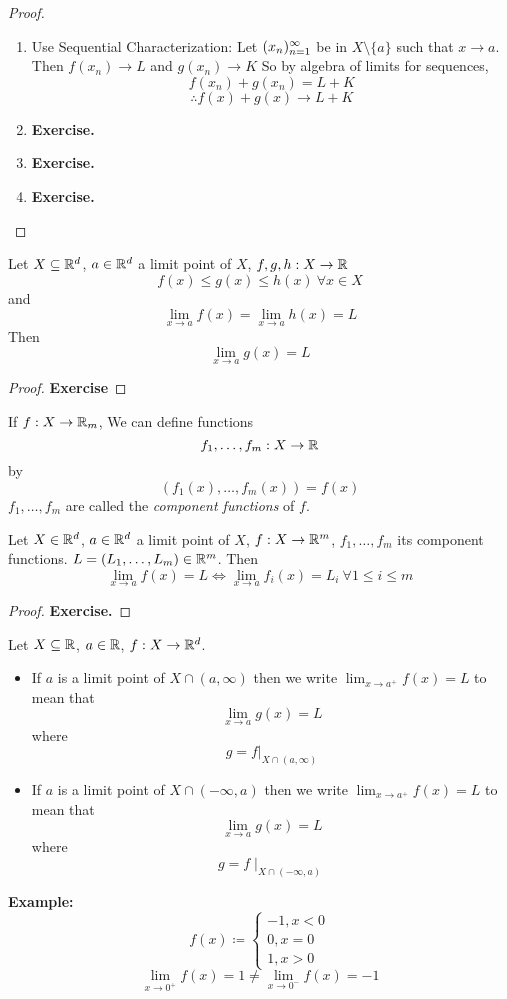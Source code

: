 \documentclass[openany]{report}
\begin{document}
\begin{proof}
    \begin{enumerate}[label=(\roman*)]
        \item Use Sequential Characterization: Let $({x}_n)_{n=1}^\infty$ be in $X \setminus \{a\}$
        such that $x \rightarrow a$. Then $f(x_n) \rightarrow L$ and $g(x_n) \rightarrow K$
        So by algebra of limits for sequences, 
        $$f(x_n) + g(x_n) = L + K$$
        $$\therefore f(x) + g(x) \rightarrow L + K$$
        \item \textbf{Exercise.}
        \item \textbf{Exercise.}
        \item \textbf{Exercise.}
    \end{enumerate}
\end{proof}
\begin{theorem}
    Let $X \subseteq \mathbb{R}^d$, $a \in \mathbb{R}^d$ a limit point of $X$, 
    $f,g,h: X \rightarrow \mathbb{R}$
    $$f(x) \leq g(x) \leq h(x) \ \forall x \in X$$
    and 
    $$\lim_{x\rightarrow a} f(x) =  \lim_{x \rightarrow a} h(x) = L$$
    Then
    $$\lim_{x\rightarrow a} g(x) = L$$
\end{theorem}
\begin{proof}
    \textbf{Exercise}
\end{proof}
If $f: X \rightarrow \mathbb{R}_m$, We can define functions 
$$f_1, \ldots, f_m: X \rightarrow \mathbb{R}$$
by 
$$(f_1(x), \ldots, f_m(x)) = f(x)$$
$f_1, \ldots, f_m$ are called the \emph{component functions} of $f$.
\begin{prop}
    Let $X \in \mathbb{R}^d$, $a \in \mathbb{R}^d$ a limit point of $X$, $f: X \rightarrow \mathbb{R}^m$,
    $f_1,\ldots, f_m$ its component functions. $L = (L_1, \ldots, L_m) \in \mathbb{R}^m$. Then
    $$\lim_{x\rightarrow a} f(x) = L \iff \lim_{x\rightarrow a} f_i(x) = L_i \ \forall 1 \leq i \leq m$$
\end{prop}
\begin{proof}
    \textbf{Exercise.}
\end{proof}
\begin{definition}
    Let $X \subseteq \mathbb{R}$, $a \in \mathbb{R}$, $f: X \rightarrow \mathbb{R}^d$.
    \begin{itemize}
        \item If $a$ is a limit point of $X \cap (a, \infty)$ then we write
            $\lim_{x\rightarrow a^+} f(x) = L$ to mean that 
            $$\lim_{x \rightarrow a} g(x) = L$$
            where 
            $$g = f{\big|}_{X \cap (a, \infty)}$$
        \item If $a$ is a limit point of $X \cap (-\infty,a)$ then we write
        $\lim_{x\rightarrow a^+} f(x) = L$ to mean that 
        $$\lim_{x \rightarrow a} g(x) = L$$
        where 
        $$g = f \mid_{X \cap (-\infty, a)}$$
    \end{itemize}
\end{definition}
\textbf{Example:}
$$f(x)\coloneqq \begin{cases}
    -1, x < 0\\
    0, x = 0\\
    1, x > 0
\end{cases}$$
$$\lim_{x \rightarrow 0^+} f(x) = 1 \neq \lim_{x \rightarrow 0^-} f(x) = -1$$
\end{document}
